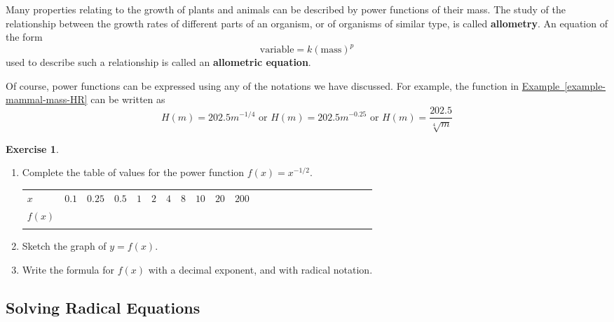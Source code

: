 \documentclass[10pt,]{book}
\newcommand{\terminology}[1]{\textbf{#1}}
\theoremstyle{plain}
\theoremstyle{definition}
\theoremstyle{definition}
\theoremstyle{definition}
\theoremstyle{definition}
\theoremstyle{definition}
\newtheorem{exercise}[theorem]{Exercise}
\numberwithin{equation}{section}
\newcommand{\hrulethin}  {\noalign{\hrule height 0.04em}}
\newcommand{\hrulethick} {\noalign{\hrule height 0.11em}}
\begin{document}
    Many properties relating to the growth of plants and animals can be described by power functions of their mass. The study of the relationship between the growth rates of different parts of an organism, or of organisms of similar type, is called \terminology{allometry}. An equation of the form
    \begin{equation*}\text{variable} = k(\text{mass})^p\end{equation*}
    used to describe such a relationship is called an \terminology{allometric equation}.
%
\par

    Of course, power functions can be expressed using any of the notations we have discussed. For example, the function in \hyperref[example-mammal-mass-HR]{Example~\ref{example-mammal-mass-HR}} can be written as
    \begin{equation*}H(m) = 202.5m^{−1/4} \text{ or } H(m) = 202.5m^{−0.25} \text{ or } H(m) = \frac{202.5}{\sqrt[4]{m}}\end{equation*}
%
\begin{exercise}\label{exercise-power-function}
\leavevmode%
\begin{enumerate}[label=*\alph**]
\item\hypertarget{li-503}{}Complete the table of values for the power function \(f (x) = x^{−1/2}\).
\leavevmode%
\begin{table}
\centering
\begin{tabular}{AcAcAcAcAcAcAcAcAcAcAcA}\hrulethick
\(x\)&\(0.1\)&\(0.25\)&\(0.5\)&\(1\)&\(2\)&\(4\)&\(8\)&\(10\)&\(20\)&\(200\)\tabularnewline\hrulethin
\(f(x)\)&\(\)&\(\)&\(\)&\(\)&\(\)&\(\)&\(\)&\(\)&\(\)&\(\)\tabularnewline\hrulethin
\end{tabular}
\end{table}
\item\hypertarget{li-504}{}Sketch the graph of \(y = f (x)\).\item\hypertarget{li-505}{}Write the formula for \(f (x)\) with a decimal exponent, and with radical notation.\end{enumerate}
\end{exercise}
\typeout{************************************************}
\typeout{************************************************}
\subsection[Solving Radical Equations]{Solving Radical Equations}\label{subsection-73}
\end{document}
